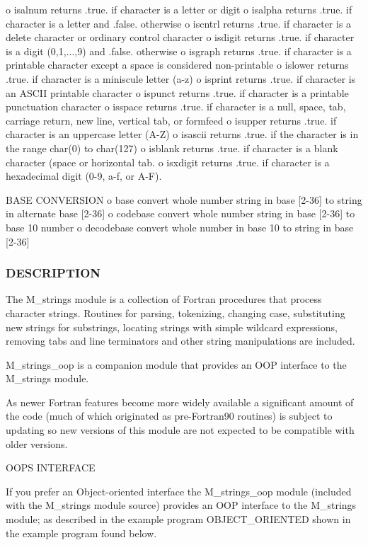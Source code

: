 o isalnum returns .true. if character is a letter or digit o isalpha returns .true. if character is a letter and .false. otherwise o iscntrl returns .true. if character is a delete character or ordinary control character o isdigit returns .true. if character is a digit (0,1,...,9) and .false. otherwise o isgraph returns .true. if character is a printable character except a space is considered non-\/printable o islower returns .true. if character is a miniscule letter (a-\/z) o isprint returns .true. if character is an A\+S\+C\+II printable character o ispunct returns .true. if character is a printable punctuation character o isspace returns .true. if character is a null, space, tab, carriage return, new line, vertical tab, or formfeed o isupper returns .true. if character is an uppercase letter (A-\/Z) o isascii returns .true. if the character is in the range char(0) to char(127) o isblank returns .true. if character is a blank character (space or horizontal tab. o isxdigit returns .true. if character is a hexadecimal digit (0-\/9, a-\/f, or A-\/F).

B\+A\+SE C\+O\+N\+V\+E\+R\+S\+I\+ON o base convert whole number string in base \mbox{[}2-\/36\mbox{]} to string in alternate base \mbox{[}2-\/36\mbox{]} o codebase convert whole number string in base \mbox{[}2-\/36\mbox{]} to base 10 number o decodebase convert whole number in base 10 to string in base \mbox{[}2-\/36\mbox{]}

\subsubsection*{D\+E\+S\+C\+R\+I\+P\+T\+I\+ON}

\begin{DoxyVerb}The M_strings module is a collection of Fortran procedures that process
character strings. Routines for parsing, tokenizing, changing case,
substituting new strings for substrings, locating strings with simple
wildcard expressions, removing tabs and line terminators and other
string manipulations are included.

M_strings_oop is a companion module that provides an OOP interface
to the M_strings module.

As newer Fortran features become more widely available a significant
amount of the code (much of which originated as pre-Fortran90 routines)
is subject to updating so new versions of this module are not expected
to be compatible with older versions.

OOPS INTERFACE

If you prefer an Object-oriented interface the M_strings_oop
module (included with the M_strings module source) provides an OOP
interface to the M_strings module; as described in the example
program OBJECT_ORIENTED shown in the example program found below.
\end{DoxyVerb}


